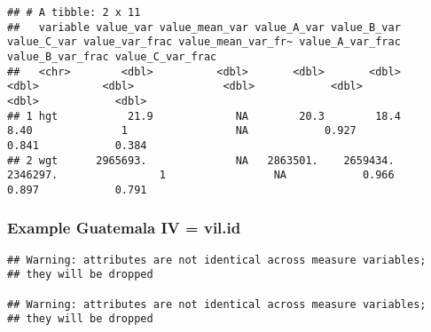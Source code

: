 \documentclass[
]{book}
\newenvironment{Shaded}{\begin{snugshade}}{\end{snugshade}}
\newcommand{\DataTypeTok}[1]{\textcolor[rgb]{0.13,0.29,0.53}{#1}}
\newcommand{\DecValTok}[1]{\textcolor[rgb]{0.00,0.00,0.81}{#1}}
\newcommand{\KeywordTok}[1]{\textcolor[rgb]{0.13,0.29,0.53}{\textbf{#1}}}
\newcommand{\NormalTok}[1]{#1}
\newcommand{\OperatorTok}[1]{\textcolor[rgb]{0.81,0.36,0.00}{\textbf{#1}}}
\newcommand{\OtherTok}[1]{\textcolor[rgb]{0.56,0.35,0.01}{#1}}
\newcommand{\StringTok}[1]{\textcolor[rgb]{0.31,0.60,0.02}{#1}}
\begin{document}
\begin{verbatim}
## # A tibble: 2 x 11
##   variable value_var value_mean_var value_A_var value_B_var value_C_var value_var_frac value_mean_var_fr~ value_A_var_frac value_B_var_frac value_C_var_frac
##   <chr>        <dbl>          <dbl>       <dbl>       <dbl>       <dbl>          <dbl>              <dbl>            <dbl>            <dbl>            <dbl>
## 1 hgt           21.9             NA        20.3        18.4        8.40              1                 NA            0.927            0.841            0.384
## 2 wgt      2965693.              NA   2863501.    2659434.   2346297.                1                 NA            0.966            0.897            0.791
\end{verbatim}

\hypertarget{example-guatemala-iv-vil.id}{%
\subsubsection{Example Guatemala IV = vil.id}\label{example-guatemala-iv-vil.id}}

\begin{Shaded}
\end{Shaded}

\begin{verbatim}
## Warning: attributes are not identical across measure variables;
## they will be dropped

## Warning: attributes are not identical across measure variables;
## they will be dropped
\end{verbatim}
\end{document}
